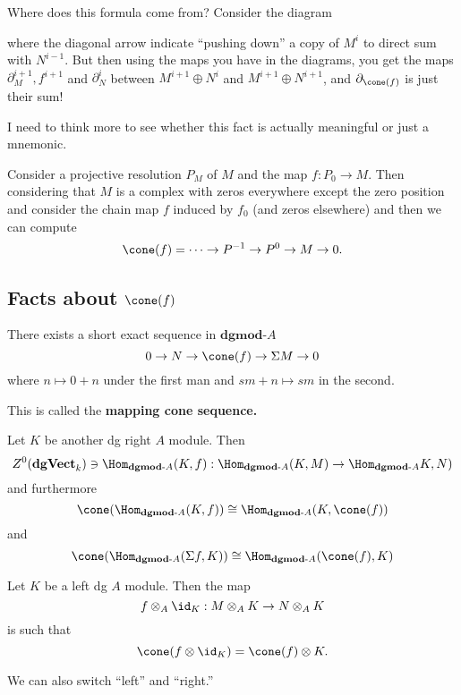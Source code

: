 \documentclass[12pt]{article}
\newcommand*{\dgVectk}{\mathbf{dgVect}_k}
\newcommand*{\dgmodA}{\mathbf{dgmod}\text{-}A}
\begin{document}
\begin{rmk}
	Where does this formula come from? Consider the diagram

	\begin{center}
	\end{center}

	\noindent where the diagonal arrow indicate ``pushing down'' a copy of $M^i$ to direct sum with $N^{i-1}$.
	But then using the maps you have in the diagrams, you get the maps $\partial_M^{i+1},f^{i+1}$ and $\partial_N^i$
	between $M^{i+1}\oplus N^i$ and $M^{i+1}\oplus N^{i+1}$, and $\partial_{\cone(f)}$ is just their sum!

	I need to think more to see whether this fact is actually meaningful or just a mnemonic.
\end{rmk}
\begin{ex}
	Consider a projective resolution $P_M$ of $M$ and the map $f:P_0\to M$. Then considering that $M$ is 
	a complex with zeros everywhere except the zero position and consider the chain map $f$ induced by $f_0$
	(and zeros elsewhere) and then we can compute
	\[\cone(f)=\cdots \to P^{-1}\to P^0\to M\to 0. \]
\end{ex}
\subsection{Facts about $\cone(f)$}
\begin{rmk}
	There exists a short exact sequence in $\dgmodA$
	\[0\to N\to\cone(f)\to\Sigma M\to 0\]
	where $n\mapsto 0+n$ under the first man and $sm+n\mapsto sm$ in the second.

	This is called the \textbf{mapping cone sequence.}
\end{rmk}
\begin{rmk}
	Let $K$ be another dg right $A$ module. Then
	\[Z^0(\dgVectk)\ni\Hom_{\dgmodA}(K,f):\Hom_{\dgmodA}(K,M)\to\Hom_{\dgmodA}K,N)\]
	and furthermore
	\[\cone(\Hom_{\dgmodA}(K,f))\cong\Hom_{\dgmodA}(K,\cone(f))\]
	and
	\[\cone(\Hom_{\dgmodA}(\Sigma f,K))\cong\Hom_{\dgmodA}(\cone(f),K)\]
\end{rmk}
\begin{rmk}
	Let $K$ be a left dg $A$ module. Then the map
	\[f\otimes_A \id_K:M\otimes_AK\to N\otimes_AK\]
	is such that
	\[\cone(f\otimes \id_K)=\cone(f)\otimes K.\]

	We can also switch ``left'' and ``right.''
\end{rmk}
\end{document}
